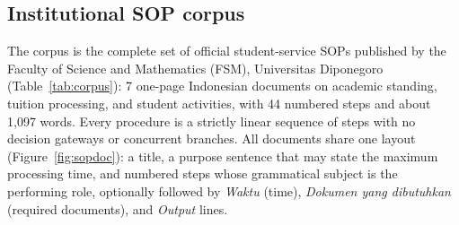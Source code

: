 \documentclass[preprint,10pt]{elsarticle}
\begin{document}
\subsection{Institutional SOP corpus}
The corpus is the complete set of official student-service SOPs published by the Faculty of Science and Mathematics (FSM), Universitas Diponegoro (Table~\ref{tab:corpus}): 7 one-page Indonesian documents on academic standing, tuition processing, and student activities, with 44 numbered steps and about 1,097 words. Every procedure is a strictly linear sequence of steps with no decision gateways or concurrent branches. All documents share one layout (Figure~\ref{fig:sopdoc}): a title, a purpose sentence that may state the maximum processing time, and numbered steps whose grammatical subject is the performing role, optionally followed by \emph{Waktu} (time), \emph{Dokumen yang dibutuhkan} (required documents), and \emph{Output} lines.

\begin{table}[!htbp]
\centering
\caption{Characteristics of the 7 FSM Universitas Diponegoro SOP documents. ``PDF steps'' denotes numbered steps in official source documents; ``Graph steps'' denotes nodes in the curated workflow graph.}
\label{tab:corpus}
\small
\setlength{\tabcolsep}{4pt}
\end{table}
\end{document}
